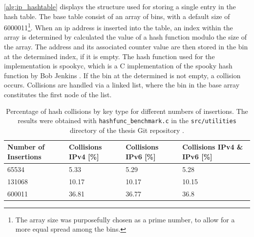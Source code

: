 \ref{alg:ip_hashtable} displays the structure used for storing a single entry in the hash table. The base
table consist of an array of bins, with a default size of 6000011\footnote{The array size was purposefully chosen as a prime number, to allow for a more equal spread among the bins.}.
When an ip address is inserted into the table, an index within the array is determined by calculated the value of a hash function modulo 
the size of the array. The address and its associated counter value are then stored in the bin at the determined index, if it is empty. 
The hash function used for the implementation is spookyc, which is a C implementation of
the spooky hash function by Bob Jenkins \cite{spookyc}. If the bin at the determined is not empty, a collision occurs.
Collisions are handled via a linked list, where the bin in the base array constitutes the first node of the list.
\begin{table}[h!]
    \centering
    \small
    \begin{tabular}{llll}
        \toprule
        \textbf{Number of Insertions} & \textbf{Collisions IPv4 [\%]} & \textbf{Collisions IPv6 [\%]} & \textbf{Collisions IPv4 \& IPv6 [\%]}\\ \midrule 
        65534 & 5.33 & 5.29 & 5.28 \\ \midrule
        131068 & 10.17 & 10.17 & 10.15 \\ \midrule
        600011 & 36.81 & 36.77 & 36.8 \\
        \bottomrule
    \end{tabular}
    \caption[Hash Collisions]{Percentage of hash collisions by key type for different numbers of insertions. The results were obtained
    with \texttt{hashfunc\_benchmark.c} in the \texttt{src/utilities} directory of the thesis Git repository \cite{gitlab}.}
    \label{tab:hash_col}
\end{table}

